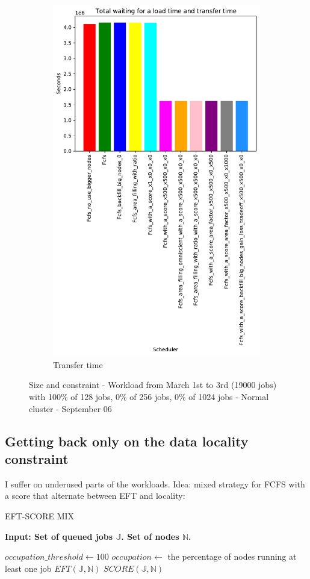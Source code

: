 \documentclass[a4paper]{article}
\newcommand{\jobset}{\ensuremath{\mathbb{J}}\xspace}
\newcommand{\nodeset}{\ensuremath{\mathbb{N}}\xspace}
\begin{document}
\begin{figure}[H]
\begin{subfigure}[b]{0.4\linewidth}\centering\includegraphics[width=0.7\linewidth]{MBSS/plot/Results_Size_And_Data_2022-03-01->2022-03-03_V10000_Total_waiting_for_a_load_time_and_transfer_time_450_128_32_256_4_1024.pdf}\caption{Transfer time}\label{45}\end{subfigure}
\caption{Size and constraint - Workload from March 1st to 3rd (19000 jobs) with 100\% of 128 jobs, 0\% of 256 jobs, 0\% of 1024 jobs - Normal cluster - September 06}\label{49}\end{figure}

\subsection{Getting back only on the data locality constraint}

I suffer on underused parts of the workloads. Idea: mixed strategy for FCFS with a score that alternate between EFT and locality:\\
\begin{algorithm}[htbp]
\caption{EFT-SCORE MIX}
\hspace*{\algorithmicindent} \textbf{Input: Set of queued jobs $\jobset$. Set of nodes $\nodeset$.} \\
\begin{algorithmic}[0]
\State $occupation\_threshold \gets 100$ 
\State $occupation \gets$ the percentage of nodes running at least one job
		\State $EFT(\jobset,\nodeset)$
	\Else
		\State $SCORE(\jobset,\nodeset)$
	\EndIf
\end{algorithmic}
\end{algorithm}
\end{document}
